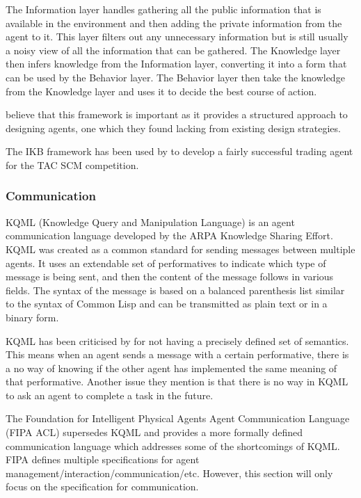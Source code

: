 The Information layer handles gathering all the public information that is available in the environment and then adding the private information from the agent to it.
This layer filters out any unnecessary information but is still usually a noisy view of all the information that can be gathered.
The Knowledge layer then infers knowledge from the Information layer, converting it into a form that can be used by the Behavior layer.
The Behavior layer then take the knowledge from the Knowledge layer and uses it to decide the best course of action.

 believe that this framework is important as it provides a structured approach to designing agents, one which they found lacking from existing design strategies.

The IKB framework has been used by  to develop a fairly successful trading agent for the TAC SCM competition.

\subsubsection{Communication}

KQML (Knowledge Query and Manipulation Language) is an agent communication language developed by the ARPA Knowledge Sharing Effort.
KQML was created as a common standard for sending messages between multiple agents.
It uses an extendable set of performatives to indicate which type of message is being sent, and then the content of the message follows in various fields.
The syntax of the message is based on a balanced parenthesis list similar to the syntax of Common Lisp and can be transmitted as plain text or in a binary form.~\cite{finin1994kqml}

KQML has been criticised by  for not having a precisely defined set of semantics.
This means when an agent sends a message with a certain performative, there is a no way of knowing if the other agent has implemented the same meaning of that performative.
Another issue they mention is that there is no way in KQML to ask an agent to complete a task in the future.

The Foundation for Intelligent Physical Agents Agent Communication Language (FIPA ACL) supersedes KQML and provides a more formally defined communication language which addresses some of the shortcomings of KQML\@.
FIPA defines multiple specifications for agent management/interaction/communication/etc.
However, this section will only focus on the specification for communication.

